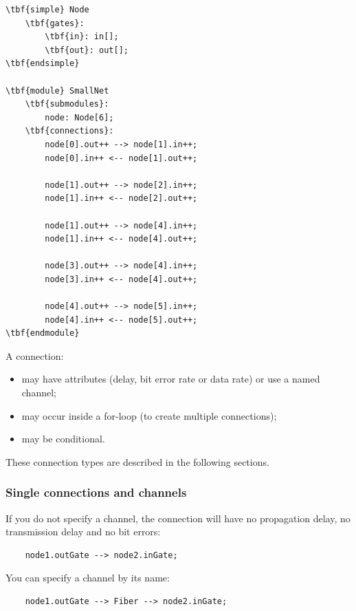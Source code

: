 \begin{Verbatim}[commandchars=\\\{\}]
\tbf{simple} Node
    \tbf{gates}:
        \tbf{in}: in[];
        \tbf{out}: out[];
\tbf{endsimple}

\tbf{module} SmallNet
    \tbf{submodules}:
        node: Node[6];
    \tbf{connections}:
        node[0].out++ --> node[1].in++;
        node[0].in++ <-- node[1].out++;

        node[1].out++ --> node[2].in++;
        node[1].in++ <-- node[2].out++;

        node[1].out++ --> node[4].in++;
        node[1].in++ <-- node[4].out++;

        node[3].out++ --> node[4].in++;
        node[3].in++ <-- node[4].out++;

        node[4].out++ --> node[5].in++;
        node[4].in++ <-- node[5].out++;
\tbf{endmodule}
\end{Verbatim}


A connection:

\begin{itemize}
  \item{may have attributes (delay, bit error rate or data rate) or
        use a named channel;}
  \item{may occur inside a for-loop (to create multiple connections);}
  \item{may be conditional.}
\end{itemize}

These connection types are described in the following sections.


\subsubsection{Single connections and channels}


If you do not specify a channel, the connection will have
no propagation delay, no transmission delay and no bit errors:

\begin{verbatim}
    node1.outGate --> node2.inGate;
\end{verbatim}

You can specify a channel by its name:
\begin{verbatim}
    node1.outGate --> Fiber --> node2.inGate;
\end{verbatim}

